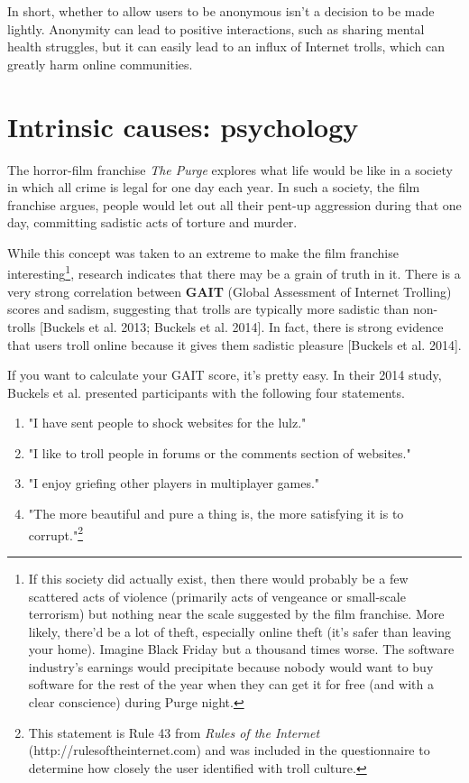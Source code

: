 \documentclass[class=book, crop=false]{standalone}
\providecommand{\keyterm}[1]{\textbf{#1}\marginnote{\scriptsize \textbf{#1}}}
\begin{document}
In short, whether to allow users to be anonymous isn’t a decision to be made lightly. Anonymity can lead to positive interactions, such as sharing mental health struggles, but it can easily lead to an influx of Internet trolls, which can greatly harm online communities.

\section{Intrinsic causes: psychology}

The horror-film franchise \textit{The Purge} explores what life would be like in a society in which all crime is legal for one day each year. In such a society, the film franchise argues, people would let out all their pent-up aggression during that one day, committing sadistic acts of torture and murder.

While this concept was taken to an extreme to make the film franchise interesting\footnote{If this society did actually exist, then there would probably be a few scattered acts of violence (primarily acts of vengeance or small-scale terrorism) but nothing near the scale suggested by the film franchise. More likely, there’d be a lot of theft, especially online theft (it’s safer than leaving your home). Imagine Black Friday but a thousand times worse. The software industry’s earnings would precipitate because nobody would want to buy software for the rest of the year when they can get it for free (and with a clear conscience) during Purge night.}, research indicates that there may be a grain of truth in it. There is a very strong correlation between \keyterm{GAIT} (Global Assessment of Internet Trolling) scores and sadism, suggesting that trolls are typically more sadistic than non-trolls [Buckels et al. 2013; Buckels et al. 2014]. In fact, there is strong evidence that users troll online because it gives them sadistic pleasure [Buckels et al. 2014].

If you want to calculate your GAIT score, it's pretty easy. In their 2014 study, Buckels et al. presented participants with the following four statements.

\begin{enumerate}
    \item "I have sent people to shock websites for the lulz."
    \item "I like to troll people in forums or the comments section of websites."
    \item "I enjoy griefing other players in multiplayer games."
    \item "The more beautiful and pure a thing is, the more satisfying it is to corrupt."\footnote{This statement is Rule 43 from \textit{Rules of the Internet} (http://rulesoftheinternet.com) and was included in the questionnaire to determine how closely the user identified with troll culture.}
\end{enumerate}
\end{document}
